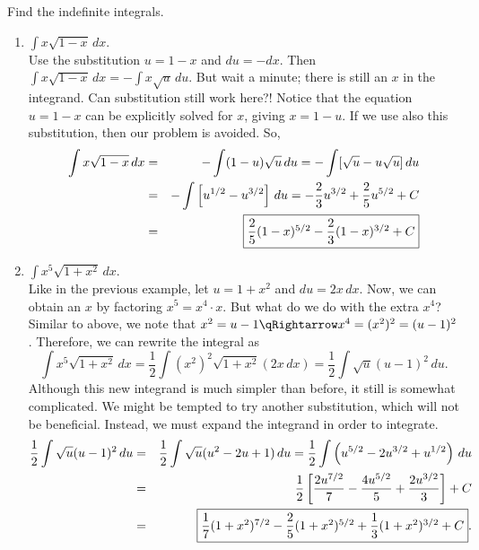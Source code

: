 \documentclass{book}
\newcommand{\dx}{\,dx}
\newcommand{\du}{\,du}
\newcommand{\dint}{\displaystyle \int}
\begin{document}
\begin{Exam} Find the indefinite integrals.
\begin{enumerate}
\item $\dint x\sqrt{1-x}\dx$.\\

Use the substitution $u = 1 - x$ and $du = -dx$. Then $\int x\sqrt{1-x}\dx = -\int x\sqrt{u}\du$. But wait a minute; there is still an $x$ in the integrand. Can substitution still work here?! Notice that the equation $u = 1 - x$ can be explicitly solved for $x$, giving $x = 1 - u$. If we use also this substitution, then our problem is avoided. So,
\begin{eqnarray*}
\dint x\sqrt{1-x}\dx &=& -\int (1-u)\sqrt{u}\du = -\int [\sqrt{u}-u\sqrt{u}]\du\\
&=& -\dint \left[u^{1/2} - u^{3/2}\right]\du = -\dfrac{2}{3}u^{3/2} + \dfrac{2}{5}u^{5/2} + C\\
&=& \fbox{$\dfrac{2}{5}(1-x)^{5/2}-\dfrac{2}{3}(1-x)^{3/2} + C$}
\end{eqnarray*}

\item $\dint x^5\sqrt{1+x^2}\dx$.\\

Like in the previous example, let $u = 1 + x^2$ and $du = 2x\dx$. Now, we can obtain an $x$ by factoring $x^5 = x^4 \cdot x$. But what do we do with the extra $x^4$? Similar to above, we note that $x^2 = u - 1 \qRightarrow x^4 = (x^2)^2 = (u - 1)^2$. Therefore, we can rewrite the integral as 
\[\int x^5\sqrt{1+x^2}\dx = \dfrac{1}{2}\int(x^2)^2\sqrt{1+x^2}(2x\dx) = \dfrac{1}{2}\int \sqrt{u}(u-1)^2\du.\]
Although this new integrand is much simpler than before, it still is somewhat complicated. We might be tempted to try another substitution, which will not be beneficial. Instead, we must expand the integrand in order to integrate.
\begin{eqnarray*}
\dfrac{1}{2}\int\sqrt{u}(u-1)^2\du &=& \dfrac{1}{2}\int \sqrt{u}(u^2-2u+1)\du = \dfrac{1}{2}\int \left(u^{5/2}-2u^{3/2}+u^{1/2}\right)\du\\
&=& \dfrac{1}{2}\left[\dfrac{2u^{7/2}}{7} - \dfrac{4u^{5/2}}{5} +\dfrac{2u^{3/2}}{3}\right] + C\\
&=& \fbox{$\dfrac{1}{7}(1+x^2)^{7/2} - \dfrac{2}{5}(1+x^2)^{5/2} + \dfrac{1}{3}(1+x^2)^{3/2} + C$}.
\end{eqnarray*}
\end{enumerate}
\end{Exam}\vs
\end{document}
